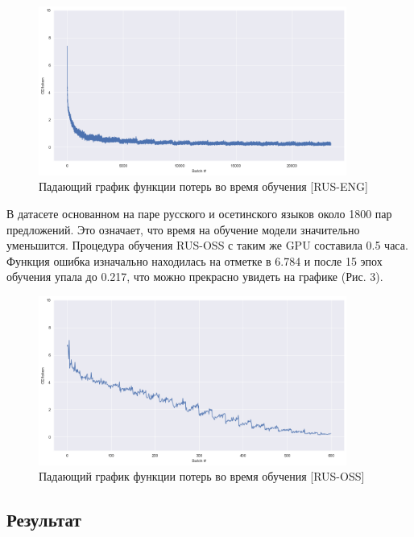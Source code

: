 \documentclass[a4paper,12pt]{article}
\begin{document}
	\begin{figure}[h]
		\centering
		\captionsetup{justification=centering}
		\includegraphics[width=0.9\textwidth]{img/RUS-ENG GRU-[1024]-Epochs[15]-EMD_DIM[256].png}
		\caption{ Падающий график функции потерь во время обучения [RUS-ENG]}
	\end{figure}
	
	В датасете основанном на паре русского и осетинского языков около 1800 пар предложений. Это означает, что время на обучение модели значительно уменьшится. Процедура обучения RUS-OSS с таким же GPU составила 0.5 часа.  Функция ошибка изначально находилась на отметке в 6.784 и после 15 эпох обучения упала до 0.217, что можно прекрасно увидеть на графике (Рис. 3).
	
	\begin{figure}[h]
		\centering
		\captionsetup{justification=centering}
		\includegraphics[width=0.9\textwidth]{img/RUS-OSS GRU-[1024]-Epochs[15]-EMD_DIM[256].png}
		\caption{ Падающий график функции потерь во время обучения [RUS-OSS] }
	\end{figure}
	
	\subsection*{Результат}
		
\end{document}
